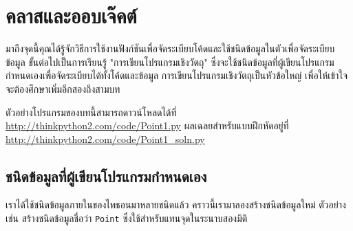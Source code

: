 \chapter{คลาสและออบเจ๊คต์} %
\label{clobjects}


มาถึงจุดนี้คุณได้รู้จักวิธีการใช้งานฟังก์ชันเพื่อจัดระเบียบโค้ดและใช้ชนิดข้อมูลในตัวเพื่อจัดระเบียบข้อมูล ขั้นต่อไปเป็นการเรียนรู้ "การเขียนโปรแกรมเชิงวัตถุ" 
ซึ่งจะใช้ชนิดข้อมูลที่ผู้เขียนโปรแกรมกำหนดเองเพื่อจัดระเบียบได้ทั้งโค้ดและข้อมูล การเขียนโปรแกรมเชิงวัตถุเป็นหัวข้อใหญ่ เพื่อให้เข้าใจจะต้องศึกษาเพิ่มอีกสองถึงสามบท



ตัวอย่างโปรแกรมของบทนี้สามารถดาวน์โหลดได้ที่ \url{http://thinkpython2.com/code/Point1.py}
ผลเฉลยสำหรับแบบฝึกหัดอยู่ที่ \url{http://thinkpython2.com/code/Point1_soln.py}


\section{ชนิดข้อมูลที่ผู้เขียนโปรแกรมกำหนดเอง} %
\label{point}


เราได้ใช้ชนิดข้อมูลภายในของไพธอนมาหลายชนิดแล้ว คราวนี้เรามาลองสร้างชนิดข้อมูลใหม่ ตัวอย่างเช่น สร้างชนิดข้อมูลชื่อว่า {\tt Point} ซึ่งใช้สำหรับแทนจุดในระนาบสองมิติ



